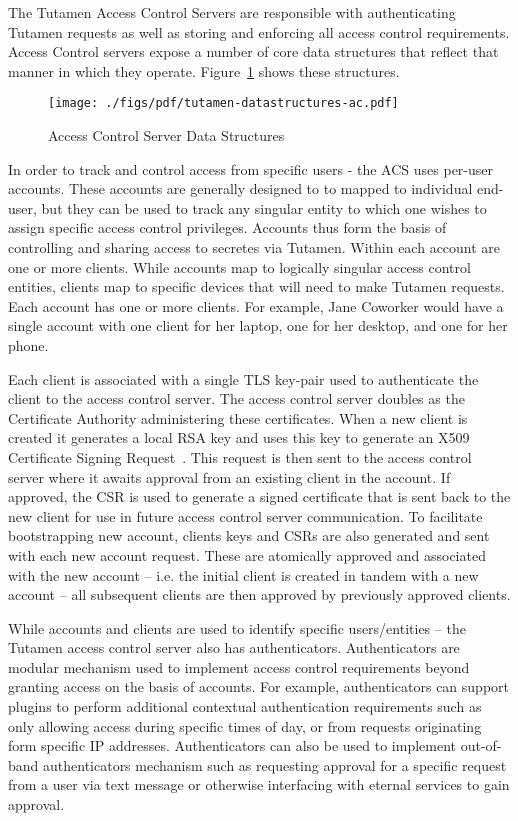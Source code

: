 The Tutamen Access Control Servers are responsible with authenticating
Tutamen requests as well as storing and enforcing all access control
requirements. Access Control servers expose a number of core data
structures that reflect that manner in which they
operate. Figure~\ref{fig:tutamen:acstructs} shows these structures.

\begin{figure}[th]
  \centering
  \texttt{[image: ./figs/pdf/tutamen-datastructures-ac.pdf]}
  \caption{Access Control Server Data Structures}
  \label{fig:tutamen:acstructs}
\end{figure}

In order to track and control access from specific users - the ACS
uses per-user accounts. These accounts are generally designed to to
mapped to individual end-user, but they can be used to track any
singular entity to which one wishes to assign specific access control
privileges. Accounts thus form the basis of controlling and sharing
access to secretes via Tutamen. Within each account are one or more
clients. While accounts map to logically singular access control
entities, clients map to specific devices that will need to make
Tutamen requests. Each account has one or more clients. For example,
Jane Coworker would have a single account with one client for her
laptop, one for her desktop, and one for her phone.

Each client is associated with a single TLS key-pair used to
authenticate the client to the access control server. The access
control server doubles as the Certificate Authority administering
these certificates. When a new client is created it generates a local
RSA key and uses this key to generate an X509 Certificate Signing
Request~\cite{rfc5280}. This request is then sent to the access
control server where it awaits approval from an existing client in the
account. If approved, the CSR is used to generate a signed certificate
that is sent back to the new client for use in future access control
server communication. To facilitate bootstrapping new account, clients
keys and CSRs are also generated and sent with each new account
request. These are atomically approved and associated with the new
account -- i.e. the initial client is created in tandem with a new
account -- all subsequent clients are then approved by previously
approved clients.

While accounts and clients are used to identify specific
users/entities -- the Tutamen access control server also has
authenticators. Authenticators are modular mechanism used to implement
access control requirements beyond granting access on the basis of
accounts. For example, authenticators can support plugins to perform
additional contextual authentication requirements such as only
allowing access during specific times of day, or from requests
originating form specific IP addresses. Authenticators can also be
used to implement out-of-band authenticators mechanism such as
requesting approval for a specific request from a user via text
message or otherwise interfacing with eternal services to gain
approval.

